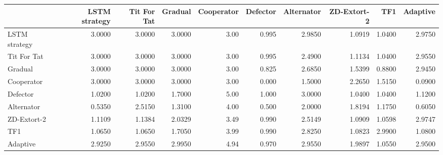 \begin{tabular}{lrrrrrrrrr}
\toprule
{} &  LSTM strategy &  Tit For Tat &  Gradual &  Cooperator &  Defector &  Alternator &  ZD-Extort-2 &     TF1 &  Adaptive \\
\midrule
LSTM strategy &         3.0000 &       3.0000 &   3.0000 &        3.00 &     0.995 &      2.9850 &       1.0919 &  1.0400 &    2.9750 \\
Tit For Tat   &         3.0000 &       3.0000 &   3.0000 &        3.00 &     0.995 &      2.4900 &       1.1134 &  1.0400 &    2.9550 \\
Gradual       &         3.0000 &       3.0000 &   3.0000 &        3.00 &     0.825 &      2.6850 &       1.5399 &  0.8800 &    2.9450 \\
Cooperator    &         3.0000 &       3.0000 &   3.0000 &        3.00 &     0.000 &      1.5000 &       2.2650 &  1.5150 &    0.0900 \\
Defector      &         1.0200 &       1.0200 &   1.7000 &        5.00 &     1.000 &      3.0000 &       1.0400 &  1.0400 &    1.1200 \\
Alternator    &         0.5350 &       2.5150 &   1.3100 &        4.00 &     0.500 &      2.0000 &       1.8194 &  1.1750 &    0.6050 \\
ZD-Extort-2   &         1.1109 &       1.1384 &   2.0329 &        3.49 &     0.990 &      2.5149 &       1.0909 &  1.0598 &    2.9747 \\
TF1           &         1.0650 &       1.0650 &   1.7050 &        3.99 &     0.990 &      2.8250 &       1.0823 &  2.9900 &    1.0800 \\
Adaptive      &         2.9250 &       2.9550 &   2.9950 &        4.94 &     0.970 &      2.9550 &       1.9897 &  1.0550 &    2.9500 \\
\bottomrule
\end{tabular}
